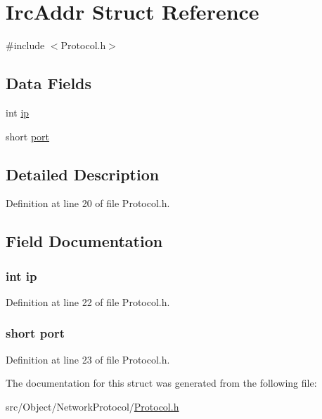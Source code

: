 \hypertarget{struct_irc_addr}{
\section{IrcAddr Struct Reference}
\label{struct_irc_addr}
}


{\ttfamily \#include $<$Protocol.h$>$}

\subsection*{Data Fields}
\begin{DoxyCompactItemize}
\item 
int \hyperlink{struct_irc_addr_addd335afdb9230f431842ebb6cbbce62}{ip}
\item 
short \hyperlink{struct_irc_addr_aee6a7f5f7c1e964cbd84deec9c53ba15}{port}
\end{DoxyCompactItemize}


\subsection{Detailed Description}


Definition at line 20 of file Protocol.h.



\subsection{Field Documentation}
\hypertarget{struct_irc_addr_addd335afdb9230f431842ebb6cbbce62}{
\subsubsection[{ip}]{\setlength{\rightskip}{0pt plus 5cm}int {\bf ip}}}
\label{struct_irc_addr_addd335afdb9230f431842ebb6cbbce62}


Definition at line 22 of file Protocol.h.

\hypertarget{struct_irc_addr_aee6a7f5f7c1e964cbd84deec9c53ba15}{
\subsubsection[{port}]{\setlength{\rightskip}{0pt plus 5cm}short {\bf port}}}
\label{struct_irc_addr_aee6a7f5f7c1e964cbd84deec9c53ba15}


Definition at line 23 of file Protocol.h.



The documentation for this struct was generated from the following file:\begin{DoxyCompactItemize}
\item 
src/Object/NetworkProtocol/\hyperlink{_protocol_8h}{Protocol.h}\end{DoxyCompactItemize}
